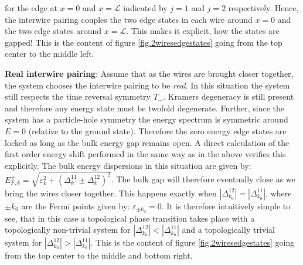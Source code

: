 for the edge at $x = 0$ and $x = \mathcal{L}$ indicated by $j = 1$ and $j = 2$ respectively. Hence, the interwire pairing couples the two edge states in each wire around $x = 0$ and the two edge states around $x = \mathcal{L}$. This makes it explicit, how the states are gapped! This is the content of figure \ref{fig.2wiresedgestates} going from the top center to the middle left. 

\textbf{Real interwire pairing}: Assume that as the wires are brought closer together, the system chooses the interwire pairing to be \textit{real}. In this situation the system still respects the time reversal symmetry $T_-$. Kramers degeneracy is still present and therefore any energy state must be twofold degenerate. Further, since the system has a particle-hole symmetry the energy spectrum is symmetric around $E = 0$ (relative to the ground state). Therefore the zero energy edge states are locked as long as the bulk energy gap remains open. A direct calculation of the first order energy shift performed in the same way as in the above verifies this explicitly. The bulk energy dispersions in this situation are given by: $E^{\pm}_{F,k} = \sqrt{\varepsilon^2_k + (\Delta^{11}_k \pm \Delta^{12}_k)^2}$. The bulk gap will therefore eventually close as we bring the wires closer together. This happens exactly when $|\Delta^{12}_{k_0}| = |\Delta^{11}_{k_0}|$, where $\pm k_0$ are the Fermi points given by: $\varepsilon_{\pm k_0} = 0$. It is therefore intuitively simple to see, that in this case a topological phase transition takes place with a topologically non-trivial system for $|\Delta^{12}_{k_0}| < |\Delta^{11}_{k_0}|$ and a topologically trivial system for $|\Delta^{12}_{k_0}| > |\Delta^{11}_{k_0}|$. This is the content of figure \ref{fig.2wiresedgestates} going from the top center to the middle and bottom right. 

